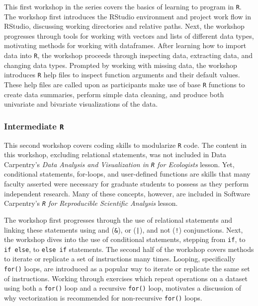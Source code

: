 \documentclass[12pt]{article}
\begin{document}
\noindent This first workshop in the series covers the basics of learning to
program in \texttt{R}. The workshop first introduces the RStudio environment and
project work flow in RStudio, discussing working directories and relative paths.
Next, the workshop progresses through tools for working with vectors and lists 
of different data types, motivating methods for working with dataframes. After
learning how to import data into \texttt{R}, the workshop proceeds through
inspecting data, extracting data, and changing data types. Prompted by working
with missing data, the workshop introduces \texttt{R} help files to inspect
function arguments and their default values. These help files are called upon
as participants make use of base \texttt{R} functions to create data summaries,
perform simple data cleaning, and produce both univariate and bivariate
visualizations of the data. 

\subsubsection{Intermediate \texttt{R}}
\label{sec:intermed}

\noindent This second workshop covers coding skills to modularize \texttt{R} code. 
The content in this workshop, excluding relational statements, was not
included in Data Carpentry's \emph{Data Analysis and Visualization in \texttt{R}
for Ecologists} lesson.
Yet, conditional statements, for-loops, and user-defined
functions are skills that many faculty asserted were necessary for graduate
students to possess as they perform independent research. Many of these
concepts, however, are included in Software Carpentry's 
\emph{\texttt{R} for Reproducible Scientific Analysis} lesson. 

\quad The workshop first progresses through the use of relational
statements and linking these statements using and (\texttt{\&}), or
(\texttt{|}), and not (\texttt{!}) conjunctions. Next, the workshop dives into
the use of conditional statements, stepping from \texttt{if}, to \texttt{if
else}, to \texttt{else if} statements. The second half of the workshop covers
methods to iterate or replicate a set of instructions many times. Looping,
specifically \texttt{for()} loops, are introduced as a popular way to iterate or
replicate the same set of instructions. Working through exercises which
repeat operations on a dataset using both a \texttt{for()} loop and a recursive 
\texttt{for()} loop, motivates a discussion of why vectorization is 
recommended for non-recursive \texttt{for()} loops.
\end{document}
